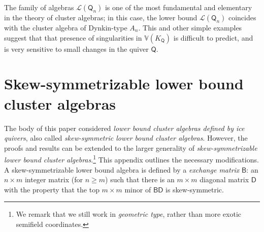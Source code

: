 \documentclass[ALCO,published]{cedram}
\numberwithin{equation}{section}
\newcommand{\B}{\mathcal{B}}
\renewcommand{\L}{\mathcal{L}}%
\newcommand{\1}{^{-1}}
\def\Q{\mathsf{Q}}
\begin{document}
The family of algebras $\L(\Q_n)$ is one of the most fundamental and elementary in the theory of cluster algebras; in this case, the lower bound $\L(\Q_n)$ coincides with the cluster algebra of Dynkin-type $A_n$.  This and other simple examples suggest that that presence of singularities in $\mathbb{V}(K_{\Q})$ is difficult to predict, and is very sensitive to small changes in the quiver $\Q$.

\section{Skew-symmetrizable lower bound cluster algebras}\label{section: skew}

\def\B{\mathsf{B}}

The body of this paper considered \emph{lower bound cluster algebras defined by ice quivers}, also called \emph{skew-symmetric lower bound cluster algebras}.  However, the proofs and results can be extended to the larger generality of \emph{skew-symmetrizable lower bound cluster algebras}.\footnote{We remark that we still work in \emph{geometric type}, rather than more exotic semifield coordinates.}  This appendix outlines the necessary modifications.  
A skew-symmetrizable lower bound algebra is defined by a \textit{exchange matrix} $\B$: an $n\times m$ integer matrix (for $n\geq m$) such that there is an $m\times m$ diagonal matrix $\mathsf{D}$ with the property that the top $m\times m$ minor of $\B\mathsf{D}$ is skew-symmetric.
\end{document}
